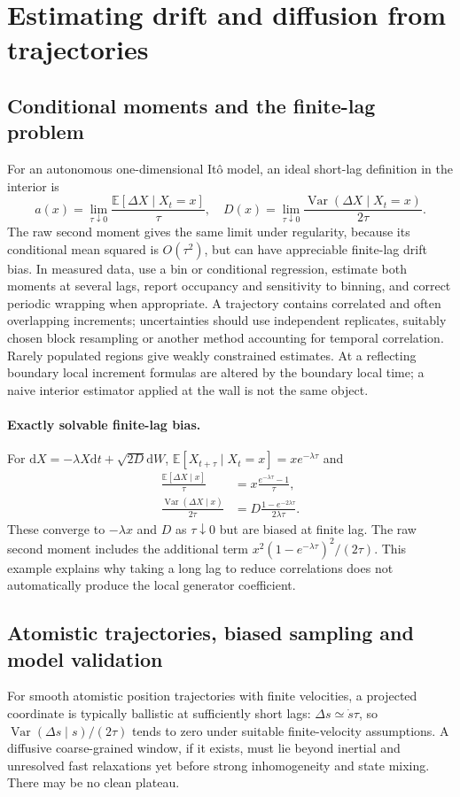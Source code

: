 \documentclass[11pt,a4paper]{article}
\newcommand{\dd}{\mathrm d}
\newcommand{\E}{\mathbb E}
\theoremstyle{remark}\newtheorem*{remark}{Physical interpretation}
\begin{document}
\section{Estimating drift and diffusion from trajectories}
\subsection{Conditional moments and the finite-lag problem}
For an autonomous one-dimensional It\^o model, an ideal short-lag definition in the interior is
\begin{equation}\label{kmest}
a(x)=\lim_{\tau\downarrow0}\frac{\E[\Delta X\mid X_t=x]}\tau,\quad
D(x)=\lim_{\tau\downarrow0}\frac{\operatorname{Var}(\Delta X\mid X_t=x)}{2\tau}.
\end{equation}
The raw second moment gives the same limit under regularity, because its conditional mean squared is $O(\tau^2)$, but can have appreciable finite-lag drift bias. In measured data, use a bin or conditional regression, estimate both moments at several lags, report occupancy and sensitivity to binning, and correct periodic wrapping when appropriate. A trajectory contains correlated and often overlapping increments; uncertainties should use independent replicates, suitably chosen block resampling or another method accounting for temporal correlation. Rarely populated regions give weakly constrained estimates. At a reflecting boundary local increment formulas are altered by the boundary local time; a naive interior estimator applied at the wall is not the same object.

\paragraph{Exactly solvable finite-lag bias.} For $\dd X=-\lambda X\dd t+\sqrt{2D}\dd W$, $\E[X_{t+\tau}\mid X_t=x]=xe^{-\lambda\tau}$ and
\begin{align}
\frac{\E[\Delta X\mid x]}{\tau}&=x\frac{e^{-\lambda\tau}-1}{\tau},\\
\frac{\operatorname{Var}(\Delta X\mid x)}{2\tau}&=D\frac{1-e^{-2\lambda\tau}}{2\lambda\tau}.
\end{align}
These converge to $-\lambda x$ and $D$ as $\tau\downarrow0$ but are biased at finite lag. The raw second moment includes the additional term $x^2(1-e^{-\lambda\tau})^2/(2\tau)$. This example explains why taking a long lag to reduce correlations does not automatically produce the local generator coefficient.

\subsection{Atomistic trajectories, biased sampling and model validation}
For smooth atomistic position trajectories with finite velocities, a projected coordinate is typically ballistic at sufficiently short lags: $\Delta s\simeq \dot s\tau$, so $\operatorname{Var}(\Delta s\mid s)/(2\tau)$ tends to zero under suitable finite-velocity assumptions. A diffusive coarse-grained window, if it exists, must lie beyond inertial and unresolved fast relaxations yet before strong inhomogeneity and state mixing. There may be no clean plateau.
\end{document}
